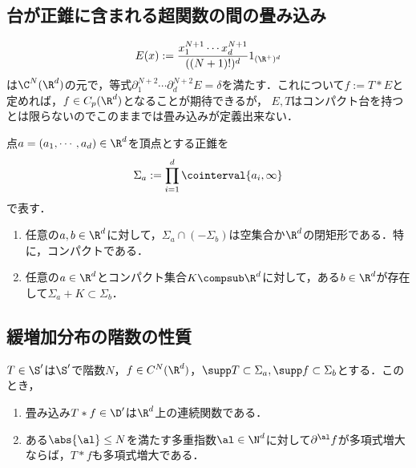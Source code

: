 \documentclass[uplatex,dvipdfmx]{jsreport}
\begin{document}
\subsection{台が正錐に含まれる超関数の間の畳み込み}

\begin{tcolorbox}[colframe=ForestGreen, colback=ForestGreen!10!white,breakable,colbacktitle=ForestGreen!40!white,coltitle=black,fonttitle=\bfseries\sffamily,
title=]
    \[E(x):=\frac{x_1^{N+1}\cdots x^{N+1}_d}{((N+1)!)^d}1_{(\R^+)^d}\]
    は$\C^N(\R^d)$の元で，等式$\partial_1^{N+2}\cdots\partial^{N+2}_dE=\delta$を満たす．これについて$f:=T*E$と定めれば，$f\in C_p(\R^d)$となることが期待できるが，
    $E,T$はコンパクト台を持つとは限らないのでこのままでは畳み込みが定義出来ない．
\end{tcolorbox}

\begin{notation}
    点$a=(a_1,\cdots,a_d)\in\R^d$を頂点とする正錐を
    \[\Sigma_a:=\prod^d_{i=1}{\cointerval{a_i,\infty}}\]
    で表す．
\end{notation}

\begin{proposition}\mbox{}
    \begin{enumerate}
        \item 任意の$a,b\in\R^d$に対して，$\Sigma_a\cap(-\Sigma_b)$は空集合か$\R^d$の閉矩形である．特に，コンパクトである．
        \item 任意の$a\in\R^d$とコンパクト集合$K\compsub\R^d$に対して，ある$b\in\R^d$が存在して$\Sigma_a+K\subset\Sigma_b$．
    \end{enumerate}
\end{proposition}

\subsection{緩増加分布の階数の性質}

\begin{proposition}
    $T\in\S'$は$\S'$で階数$N$，$f\in C^N(\R^d)$，$\supp T\subset\Sigma_a,\supp f\subset\Sigma_b$とする．このとき，
    \begin{enumerate}
        \item 畳み込み$T*f\in\D'$は$\R^d$上の連続関数である．
        \item ある$\abs{\al}\le N$を満たす多重指数$\al\in\N^d$に対して$\partial^\al f$が多項式増大ならば，$T*f$も多項式増大である．
    \end{enumerate}
\end{proposition}
\end{document}
